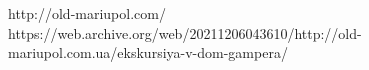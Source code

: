  
 
 
 
 

http://old-mariupol.com/
https://web.archive.org/web/20211206043610/http://old-mariupol.com.ua/ekskursiya-v-dom-gampera/
